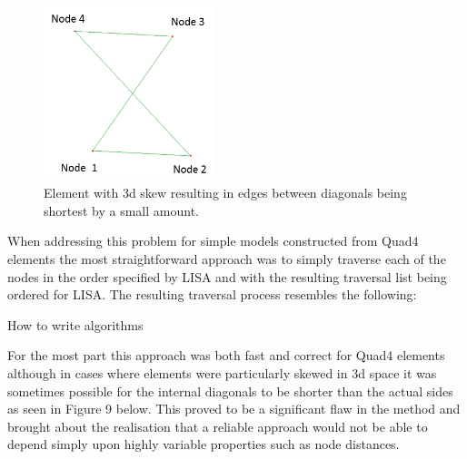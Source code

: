 \begin{figure}[!h]
  \centerline{\includegraphics[width=50mm , scale=1]{../Graphics/BadlyOrderedNodes.png}}
  \caption{Element with 3d skew resulting in edges between diagonals being shortest by a small amount.
  }
  \label{fig:h-refinementImp}
\end{figure}

\noindent
When addressing this problem for simple models constructed from Quad4 elements the most straightforward approach was to simply traverse each of the nodes in the order specified by LISA and with the resulting traversal list being ordered for LISA. The resulting traversal process resembles the following: \\


\begin{algorithm}[H]
 \caption{How to write algorithms}
\end{algorithm}

\noindent
For the most part this approach was both fast and correct for Quad4 elements although in cases where elements were particularly skewed in 3d space it was sometimes possible for the internal diagonals to be shorter than the actual sides as seen in Figure 9 below. This proved to be a significant flaw in the method and brought about the realisation that a reliable approach would not be able to depend simply upon highly variable properties such as node distances. \\ 

